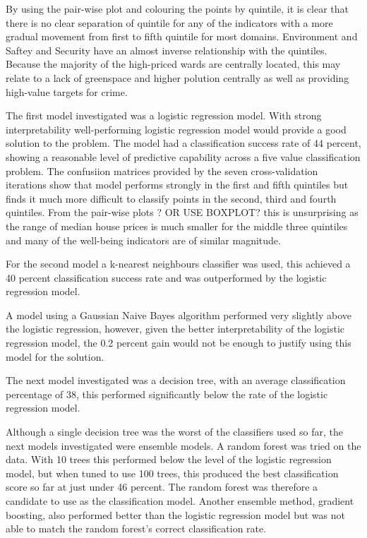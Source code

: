 By using the pair-wise plot and colouring the points by quintile, it is clear that there is no clear separation of quintile for any of the indicators with a more gradual movement from first to fifth quintile for most domains. Environment and Saftey and Security have an almost inverse relationship with the quintiles. Because the majority of the high-priced wards are centrally located, this may relate to a lack of greenspace and higher polution centrally as well as providing high-value targets for crime. 

The first model investigated was a logistic regression model. With strong interpretability well-performing logistic regression model would provide a good solution to the problem.
The model had a classification success rate of 44 percent, showing a reasonable level of predictive capability across a five value classification problem. The confusiion matrices provided by the seven cross-validation iterations show that model performs strongly in the first and fifth quintiles but finds it much more difficult to classify points in the second, third and fourth quintiles.
From the pair-wise plots ? OR USE BOXPLOT? this is unsurprising as the range of median house prices is much smaller for the middle three quintiles and many of the well-being indicators are of similar magnitude.

For the second model a k-nearest neighbours classifier was used, this achieved a 40 percent classification success rate and was outperformed by the logistic regression model.

A model using a Gaussian Naive Bayes algorithm performed very slightly above the logistic regression, however, given the better interpretability of the logistic regression model, the 0.2 percent gain would not be enough to justify using this model for the solution.

The next model investigated was a decision tree, with an average classification percentage of 38, this performed significantly below the rate of the logistic regression model.

Although a single decision tree was the worst of the classifiers used so far, the next models investigated were ensemble models. A random forest was tried on the data. With 10 trees this performed below the level of the logistic regression model, but when tuned to use 100 trees, this produced the best classification score so far at just under 46 percent. The random forest was therefore a candidate to use as the classification model.
Another ensemble method, gradient boosting, also performed better than the logistic regression model but was not able to match the random forest's correct classification rate.

